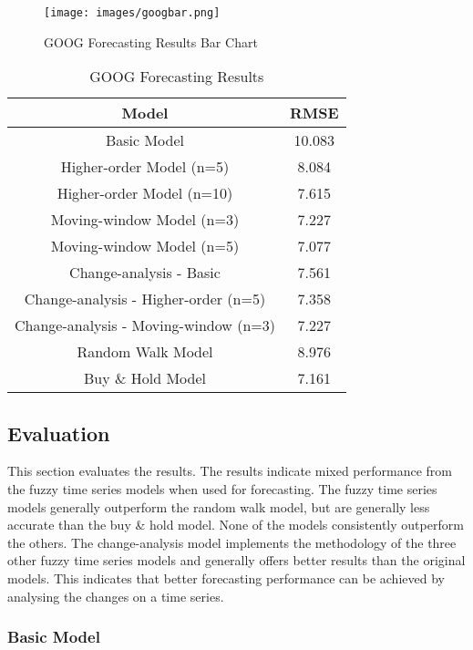 \documentclass[12pt, oneside, a4paper]{article}
\theoremstyle{definition}
\begin{document}
\begin{figure}[H]
    \centering
    \caption{GOOG Forecasting Results Bar Chart}
    \texttt{[image: images/googbar.png]}
    \label{googbar}
\end{figure}

\begin{table}[H]
	\center
	\begin{tabulary}{1.0\textwidth}{CC}
	\toprule[.15em]
	Model & RMSE \\
	\toprule[.15em]
	Basic Model & 10.083 \\
	\hline
	Higher-order Model (n=5) & 8.084\\
	\hline
	Higher-order Model (n=10) & 7.615\\
	\hline
	Moving-window Model (n=3) & 7.227\\
	\hline
	Moving-window Model (n=5) & 7.077\\
	\hline
	Change-analysis - Basic & 7.561\\
	\hline
	Change-analysis - Higher-order (n=5) & 7.358\\
	\hline
	Change-analysis - Moving-window (n=3) & 7.227\\
	\hline
	Random Walk Model & 8.976\\
	\hline
	Buy \& Hold Model & 7.161\\
  	\toprule[.15em]
	\end{tabulary}
	\caption{GOOG Forecasting Results}
	\label{googresults}
\end{table}

\newpage

\subsection{Evaluation}

This section evaluates the results. The results indicate mixed performance from the fuzzy time series models when used for forecasting. The fuzzy time series models generally outperform the random walk model, but are generally less accurate than the buy \& hold model. None of the models consistently outperform the others. The change-analysis model implements the methodology of the three other fuzzy time series models and generally offers better results than the original models. This indicates that better forecasting performance can be achieved by analysing the changes on a time series.

\subsubsection{Basic Model}
\end{document}
